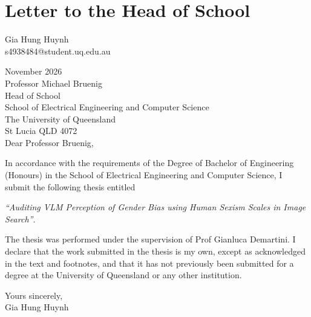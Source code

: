 \chapter*{Letter to the Head of School}
\thispagestyle{plain}


\begin{flushright}
Gia Hung Huynh\\
s4938484@student.uq.edu.au
\end{flushright}
\vspace{1em}
\noindent November 2026\\[1em]
Professor Michael Bruenig\\
Head of School\\
School of Electrical Engineering and Computer Science\\
The University of Queensland\\
St Lucia QLD 4072\\[1em]
Dear Professor Bruenig,

In accordance with the requirements of the Degree of Bachelor of Engineering
(Honours) in the School of Electrical Engineering and Computer Science, I submit the
following thesis entitled
\begin{center}
\emph{``Auditing VLM Perception of Gender Bias using Human Sexism Scales in Image Search''}.
\end{center}
The thesis was performed under the supervision of Prof Gianluca Demartini. I
declare that the work submitted in the thesis is my own, except as
acknowledged in the text and footnotes, and that it has not previously been
submitted for a degree at the University of Queensland or any other
institution.

\vspace{1em}
\begin{flushright}
Yours sincerely,\\[3em]
Gia Hung Huynh
\end{flushright}
\clearpage
